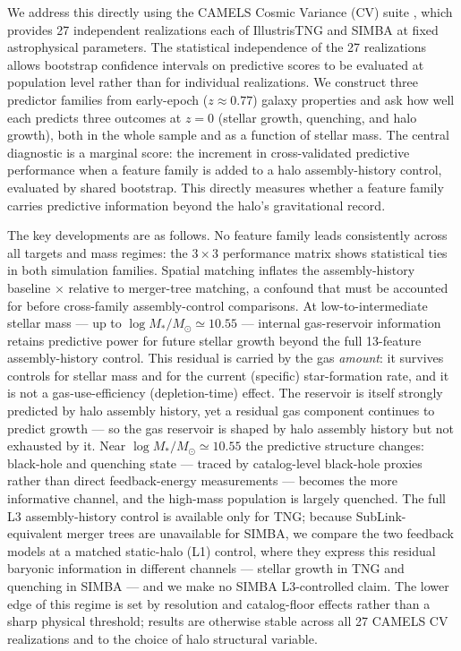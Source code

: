 \documentclass[twocolumn,linenumbers]{aastex701}
\newcommand{\logM}{\log M_*}
\begin{document}
We address this directly using the CAMELS Cosmic Variance (CV) suite
\citep{villaescuza-navarro2021}, which provides 27 independent realizations
each of IllustrisTNG \citep{weinberger2017,pillepich2018} and SIMBA
\citep{dave2019} at fixed astrophysical parameters.
The statistical independence of the 27 realizations allows bootstrap
confidence intervals on predictive scores to be evaluated at population
level rather than for individual realizations.
We construct three predictor families from early-epoch ($z \approx 0.77$)
galaxy properties and ask how well each predicts three outcomes at $z = 0$
(stellar growth, quenching, and halo growth), both in the whole sample and
as a function of stellar mass.
The central diagnostic is a marginal score: the increment in
cross-validated predictive performance when a feature family is added to a
halo assembly-history control, evaluated by shared bootstrap.
This directly measures whether a feature family carries predictive
information beyond the halo's gravitational record.

The key developments are as follows.
No feature family leads consistently across all targets and mass regimes:
the $3 \times 3$ performance matrix shows statistical ties in both
simulation families.
Spatial matching inflates the assembly-history baseline \SpatialInflation$\times$
relative to merger-tree matching, a confound that must be accounted for
before cross-family assembly-control comparisons.
At low-to-intermediate stellar mass --- up to $\logM/M_\odot \simeq 10.55$ ---
internal gas-reservoir information retains predictive power for future stellar
growth beyond the full 13-feature assembly-history control.
This residual is carried by the gas \emph{amount}: it survives controls for
stellar mass and for the current (specific) star-formation rate, and it is not
a gas-use-efficiency (depletion-time) effect.
The reservoir is itself strongly predicted by halo assembly history, yet a
residual gas component continues to predict growth --- so the gas reservoir is
shaped by halo assembly history but not exhausted by it.
Near $\logM/M_\odot \simeq 10.55$ the predictive structure changes:
black-hole and quenching state --- traced by catalog-level black-hole proxies
rather than direct feedback-energy measurements --- becomes the more
informative channel, and the high-mass population is largely quenched.
The full L3 assembly-history control is available only for TNG; because
SubLink-equivalent merger trees are unavailable for SIMBA, we compare the two
feedback models at a matched static-halo (L1) control, where they express this
residual baryonic information in different channels --- stellar growth in TNG and
quenching in SIMBA --- and we make no SIMBA L3-controlled claim.
The lower edge of this regime is set by resolution and catalog-floor effects
rather than a sharp physical threshold; results are otherwise stable across all
27 CAMELS CV realizations and to the choice of halo structural variable.
\end{document}
